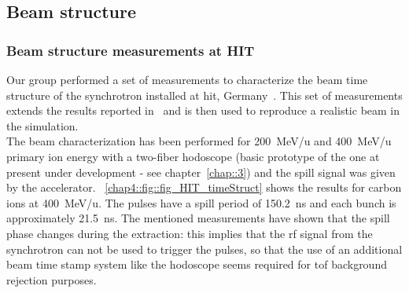 \begin{table}
\centering
\caption{Hadronic models used in the Geant4 simulations.}
\label{chap4::tab::physlist_ion}
\end{table}


\subsection{Beam structure}\label{chap4::subsec::BeamModeling}
\subsubsection{Beam structure measurements at HIT}\label{chap4::subsubsec::beam_measurement}
Our group performed a set of measurements to characterize the beam time structure of the synchrotron installed at \gls{hit}, Germany~\parencite{Peters2008}. This set of measurements extends the results reported in~\cite{Peters2008} and is then used to reproduce a realistic beam in the simulation.\\
The beam characterization has been performed for 200~MeV/u and 400~MeV/u primary ion energy with a two-fiber hodoscope (basic prototype of the one at present under development - see chapter~\ref{chap::3}) and the spill signal was given by the accelerator. \figurename~\ref{chap4::fig::fig_HIT_timeStruct} shows the results for carbon ions at 400~MeV/u. The pulses have a spill period of 150.2~ns and each bunch is approximately 21.5~ns.
The mentioned measurements have shown that the spill phase changes during the extraction: this implies that the \gls{rf} signal from the synchrotron can not be used to trigger the pulses, so that the use of an additional beam time stamp system like the hodoscope seems required for \gls{tof} background rejection purposes.


